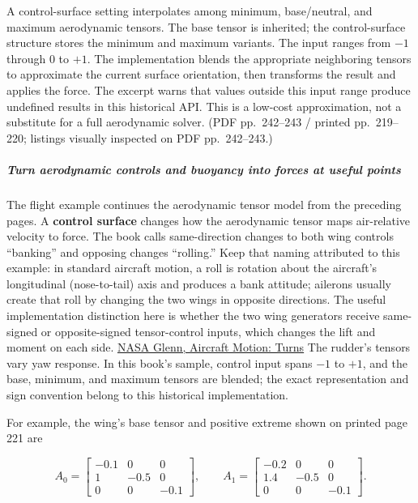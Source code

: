 A control-surface setting interpolates among minimum, base/neutral, and maximum aerodynamic tensors. The base tensor is inherited; the control-surface structure stores the minimum and maximum variants. The input ranges from \(-1\) through \(0\) to \(+1\). The implementation blends the appropriate neighboring tensors to approximate the current surface orientation, then transforms the result and applies the force. The excerpt warns that values outside this input range produce undefined results in this historical API. This is a low-cost approximation, not a substitute for a full aerodynamic solver. (PDF pp.~242--243 / printed pp.~219--220; listings visually inspected on PDF pp.~242--243.)

\subparagraph{Turn aerodynamic controls and buoyancy into forces at useful points}\label{06-engine-ii-ch033-turn-aerodynamic-controls-and-buoyancy-into-forces-at-useful-points}

\hypertarget{06-engine-ii-ch033-turn-aerodynamic-controls-and-buoyancy-into-forces-at-useful-points}{}

The flight example continues the aerodynamic tensor model from the preceding pages. A \textbf{control surface} changes how the aerodynamic tensor maps air-relative velocity to force. The book calls same-direction changes to both wing controls ``banking'' and opposing changes ``rolling.'' Keep that naming attributed to this example: in standard aircraft motion, a roll is rotation about the aircraft's longitudinal (nose-to-tail) axis and produces a bank attitude; ailerons usually create that roll by changing the two wings in opposite directions. The useful implementation distinction here is whether the two wing generators receive same-signed or opposite-signed tensor-control inputs, which changes the lift and moment on each side. \href{https://www1.grc.nasa.gov/beginners-guide-to-aeronautics/aircraft-motion-turns/}{NASA Glenn, Aircraft Motion: Turns} The rudder's tensors vary yaw response. In this book's sample, control input spans \(-1\) to \(+1\), and the base, minimum, and maximum tensors are blended; the exact representation and sign convention belong to this historical implementation.

For example, the wing's base tensor and positive extreme shown on printed page 221 are

\[
A_0=\begin{bmatrix}-0.1&0&0\\1&-0.5&0\\0&0&-0.1\end{bmatrix},\qquad
A_1=\begin{bmatrix}-0.2&0&0\\1.4&-0.5&0\\0&0&-0.1\end{bmatrix}.
\]

